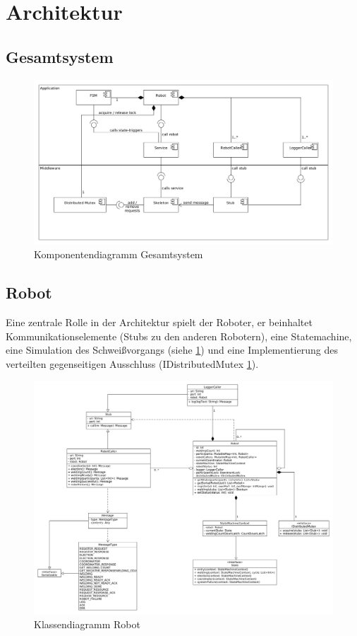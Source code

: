 \section{Architektur}

\subsection{Gesamtsystem}

\begin{figure}[h]
 \includegraphics[width=\textwidth]{../diagrams/2_gesamtsystem.png}
 \caption{Komponentendiagramm Gesamtsystem}
 \label{fig:gesamtsystem}
\end{figure}

\subsection{Robot}

Eine zentrale Rolle in der Architektur spielt der Roboter, er beinhaltet Kommunikationselemente (Stubs 
\citep{tanenbaumvansteen} zu den anderen Robotern), eine Statemachine, eine Simulation des
Schweißvorgangs (siehe \ref{fig:gesamtsystem}) und eine Implementierung des verteilten gegenseitigen
Ausschluss (IDistributedMutex \ref{fig:gesamtsystem}).

\clearpage

\begin{figure}[h]
 \includegraphics[width=\textwidth]{../diagrams/3_robot_klassendiagramm.png}
 \caption{Klassendiagramm Robot}
 \label{fig:class_robot}
\end{figure}

